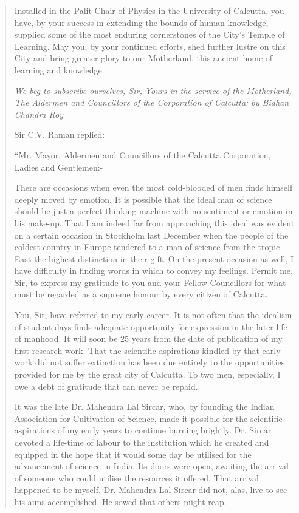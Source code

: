 \begin{quote}
{Installed in the Palit Chair of Physics in the University of
Calcutta, you have, by your success in extending the bounds of
human knowledge, supplied some of the most enduring
cornerstones of the City's Temple of Learning. May you, by your
continued efforts, shed further lustre on this City and bring
greater glory to our Motherland, this ancient home of learning
and knowledge.

{\em We beg to subscribe ourselves, Sir, Yours in the service of
the Motherland, The Aldermen and Councillors of the
Corporation of Calcutta: by Bidhan Chandra Roy}

Sir C.V. Raman replied:

``Mr. Mayor, Aldermen and Councillors of the Calcutta
Corporation, Ladies and Gentlemen:-


There are occasions when even the most cold-blooded of men
finds himself deeply moved by emotion. It is possible that the ideal
man of science should be just a perfect thinking machine with
no sentiment or emotion in his make-up. That I am indeed far
from approaching this ideal was evident on a certain occasion in
Stockholm last December when the people of the coldest country
in Europe tendered to a man of science from the tropic East the
highest distinction in their gift. On the present occasion as well,
I have difficulty in finding words in which to convey my feelings.
Permit me, Sir, to express my gratitude to you and your 
Fellow-Councillors for what must be regarded as a supreme honour by
every citizen of Calcutta.

You, Sir, have referred to my early career. It is not often
that the idealism of student days finds adequate opportunity for
expression in the later life of manhood. It will soon be 25 years
from the date of publication of my first research work. That the
scientific aspirations kindled by that early work did not suffer
extinction has been due entirely to the opportunities provided for
me by the great city of Calcutta. To two men, especially, I owe
a debt of gratitude that can never be repaid.

It was the late Dr. Mahendra Lal Sircar, who, by founding
the Indian Association for Cultivation of Science, made it possible
for the scientific aspirations of my early years to continue burning
brightly. Dr. Sircar devoted a life-time of labour to the institution
which he created and equipped in the hope that it would some
day be utilised for the advancement of science in India. Its doors
were open, awaiting the arrival of someone who could utilise the
resources it offered. That arrival happened to be myself.
Dr. Mahendra Lal Sircar did not, alas, live to see his aims
accomplished. He sowed that others might reap.

}
\end{quote}
